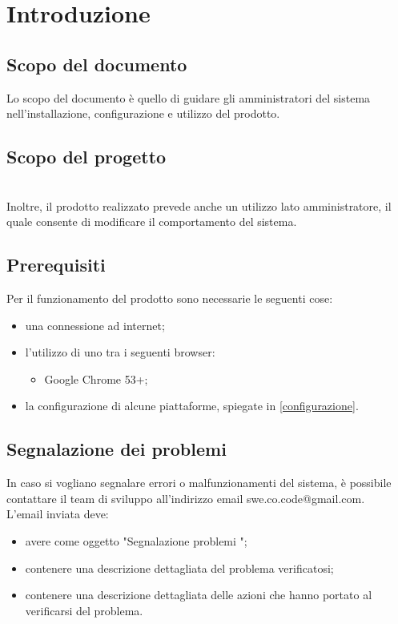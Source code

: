 \section{Introduzione}
\subsection{Scopo del documento}
Lo scopo del documento è quello di guidare gli amministratori del sistema nell'installazione, configurazione e utilizzo del prodotto.
\subsection{Scopo del progetto}
\SCOPO\\
Inoltre, il prodotto realizzato prevede anche un utilizzo lato amministratore, il quale consente di modificare il comportamento del sistema.
\subsection{Prerequisiti}
Per il funzionamento del prodotto sono necessarie le seguenti cose:
\begin{itemize}
	\item una connessione ad internet;
	\item l'utilizzo di uno tra i seguenti browser:
	\begin{itemize}
		\item Google Chrome 53+;
	\end{itemize}
	\item la configurazione di alcune piattaforme, spiegate in \ref{configurazione}.
\end{itemize}
\subsection{Segnalazione dei problemi}
In caso si vogliano segnalare errori o malfunzionamenti del sistema, è possibile contattare il team di sviluppo \GRUPPO{} all'indirizzo email swe.co.code@gmail.com. \\
L'email inviata deve:
\begin{itemize}
	\item avere come oggetto "Segnalazione problemi \PROGETTO";
	\item contenere una descrizione dettagliata del problema verificatosi;
	\item contenere una descrizione dettagliata delle azioni che hanno portato al verificarsi del problema.
\end{itemize}